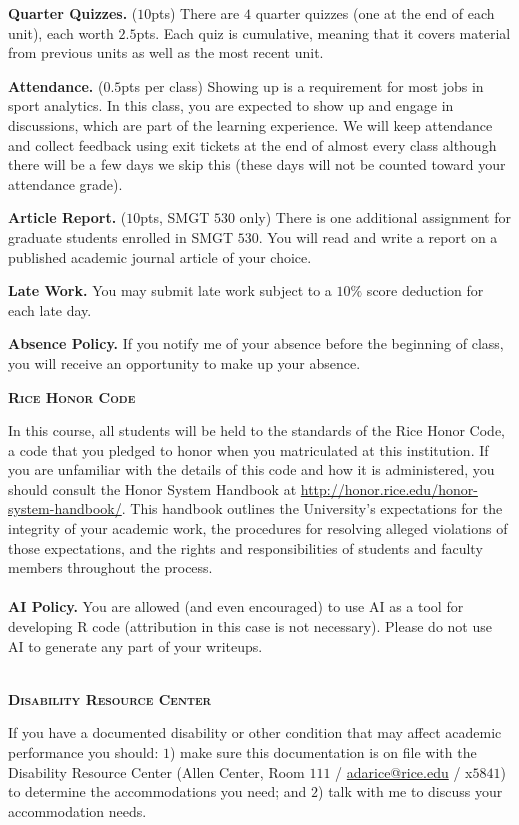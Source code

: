 \documentclass[11pt]{article}
\begin{document}
\begin{adjustwidth}{1cm}{0cm}
  \textbf{Quarter Quizzes.} ($10$pts) There are $4$ quarter quizzes (one at the end of each unit), each worth $2.5$pts. Each quiz is cumulative, meaning that it covers material from previous units as well as the most recent unit.

  \textbf{Attendance.} ($0.5$pts per class) Showing up is a requirement for most jobs in sport analytics. In this class, you are expected to show up and engage in discussions, which are part of the learning experience. We will keep attendance and collect feedback using exit tickets at the end of almost every class although there will be a few days we skip this (these days will not be counted toward your attendance grade).

  \textbf{Article Report.} ($10$pts, SMGT $530$ only) There is one additional assignment for graduate students enrolled in SMGT $530$. You will read and write a report on a published academic journal article of your choice.

  \textbf{Late Work.} You may submit late work subject to a $10\%$ score deduction for each late day.

  \textbf{Absence Policy.} If you notify me of your absence before the beginning of class, you will receive an opportunity to make up your absence.
\end{adjustwidth}

\newpage
\textbf{\textsc{Rice Honor Code}}
\begin{adjustwidth}{1cm}{0cm}
  In this course, all students will be held to the standards of the Rice Honor Code, a code that you pledged to honor when you matriculated at this institution. If you are unfamiliar with the details of this code and how it is administered, you should consult the Honor System Handbook at \url{http://honor.rice.edu/honor-system-handbook/}. This handbook outlines the University's expectations for the integrity of your academic work, the procedures for resolving alleged violations of those expectations, and the rights and responsibilities of students and faculty members throughout the process.\\
  ~\\
  \textbf{AI Policy.} You are allowed (and even encouraged) to use AI as a tool for developing R code (attribution in this case is not necessary). Please do not use AI to generate any part of your writeups.
\end{adjustwidth}

~\\
\textbf{\textsc{Disability Resource Center}}
\begin{adjustwidth}{1cm}{0cm}
  If you have a documented disability or other condition that may affect academic performance you should: $1$) make sure this documentation is on file with the Disability Resource Center (Allen Center, Room $111$ / \href{mailto:adarice@rice.edu}{adarice@rice.edu} / x$5841$) to determine the accommodations you need; and $2$) talk with me to discuss your accommodation needs.
\end{adjustwidth}
\end{document}
